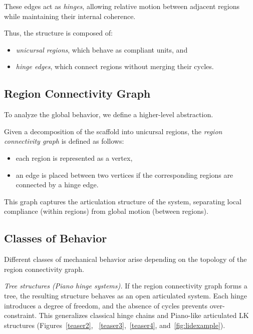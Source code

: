 \documentclass[acmtog,anonymous,review]{acmart}
\begin{document}
These edges act as \emph{hinges}, allowing relative motion between
adjacent regions while maintaining their internal coherence.

Thus, the structure is composed of:
\begin{itemize}
    \item \emph{unicursal regions}, which behave as compliant units, and
    \item \emph{hinge edges}, which connect regions without merging
    their cycles.
\end{itemize}

\subsection{Region Connectivity Graph}

To analyze the global behavior, we define a higher-level abstraction.

\begin{definition}
Given a decomposition of the scaffold into unicursal regions, the
\emph{region connectivity graph} is defined as follows:
\begin{itemize}
    \item each region is represented as a vertex,
    \item an edge is placed between two vertices if the corresponding
    regions are connected by a hinge edge.
\end{itemize}
\end{definition}

This graph captures the articulation structure of the system,
separating local compliance (within regions) from global motion
(between regions).

\subsection{Classes of Behavior}

Different classes of mechanical behavior arise depending on the
topology of the region connectivity graph.

\textit{Tree structures (Piano hinge systems).}
If the region connectivity graph forms a tree, the resulting structure
behaves as an open articulated system. Each hinge introduces a degree
of freedom, and the absence of cycles prevents over-constraint. This
generalizes classical hinge chains and Piano-like articulated LK
structures (Figures~\ref{teaser2}, ~\ref{teaser3},~\ref{teaser4}, and~\ref{fig:lidexample}).
\end{document}
